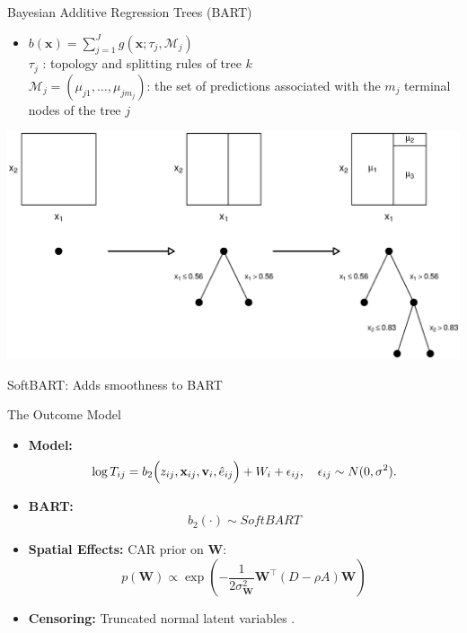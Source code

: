 \documentclass{beamer}
\begin{document}
\begin{frame}{Bayesian Additive Regression Trees (BART)}
   
    \begin{itemize}
   
    \vfill \item
      \(b(\mathbf{x}) = \sum_{j=1}^{J}g(\mathbf{x} ; \tau_j, \mathcal{M}_j)\)
   \\
    \vspace{6pt}
        \(\tau_j\) : topology and splitting rules of tree \(k\)
  \\  \vspace{6pt} 
        \(\mathcal{M}_j = (\mu_{j1}, \dots, \mu_{jm_j})\): the set of predictions associated with the \(m_j\) terminal nodes of the tree \(j\) 
    \end{itemize}
   
    
    
    \begin{center}\includegraphics[width=.6\textwidth]{pics/BARTdiagram.eps} \end{center}
   \alert{SoftBART: Adds smoothness to BART}
\end{frame}
\begin{frame}{The Outcome Model}
  \begin{itemize}
    \vfill \item \textbf{Model:} 
      \[
      \log T_{ij} = b_2\Bigl(z_{ij},\mathbf{x}_{ij},\mathbf{v}_i,\hat{e}_{ij}\Bigr) + W_i + \epsilon_{ij},\quad \epsilon_{ij}\sim N(0,\sigma^2).
      \]
      
    \vfill \item \textbf{BART:} 
      \[
      b_2(\cdot) \sim SoftBART
      \]
      
      \vfill \item \textbf{Spatial Effects:} CAR prior on \(\mathbf{W}\): 
      \[
      p(\mathbf{W}) \propto \exp\left(-\frac{1}{2\sigma_\mathbf{W}^2} \mathbf{W}^\top (D - \rho A) \mathbf{W}\right)
      \]
      
      \vfill \item \textbf{Censoring:} Truncated normal latent variables .
\end{itemize}
\end{frame}
\end{document}
